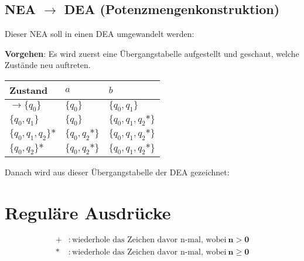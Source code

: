\documentclass[12pt, oneside]{book}
\begin{document}
\section[NEA zu DEA mit Potenzmengenkonstruktion]{NEA $\to$ DEA (Potenzmengenkonstruktion)}
Dieser NEA soll in einen DEA umgewandelt werden:
\begin{figure}[H]
    \centering
    \begin{transitiongraph}[fa]
    \end{transitiongraph}
    \label{graph:NEA_LaTeX}
\end{figure}
\sloppy
\textbf{Vorgehen}: Es wird zuerst eine Übergangstabelle aufgestellt und geschaut, welche Zustände neu auftreten.
\fussy
\begin{table}[H]
\centering
\begin{tabular}{|l|l|l|}
\hline
Zustand             & $a$              & $b$                   \\
\hline
$\to \{q_0\}$           & $\{q_0\}$           & $\{q_0,q_1\}$       \\
\hline
$\{q_0,q_1\}$       & $\{q_0\}$           & $\{q_0,q_1,q_2\mbox{*}\}$ \\
\hline
$\{q_0,q_1,q_2\}\mbox{*}$ & $\{q_0,q_2\mbox{*}\}$ & $\{q_0,q_1,q_2\mbox{*}\}$   \\
\hline
$\{q_0,q_2\}\mbox{*}$      & $\{q_0,q_2\mbox{*}\}$ & $\{q_0,q_1,q_2\mbox{*}\}$ \\
\hline
\end{tabular}
\end{table}
Danach wird aus dieser Übergangstabelle der DEA gezeichnet:
\begin{figure}[H]
    \centering
    \begin{transitiongraph}[fa]
    \end{transitiongraph}
\end{figure}
\chapter{Reguläre Ausdrücke}
\begin{align*}
    \mathbf{+} &: \text{wiederhole das Zeichen davor n-mal, wobei}\ \mathbf{n > 0}\\
    \mathbf{*} &: \text{wiederhole das Zeichen davor n-mal, wobei}\ \mathbf{n \ge 0}
\end{align*}
\end{document}

